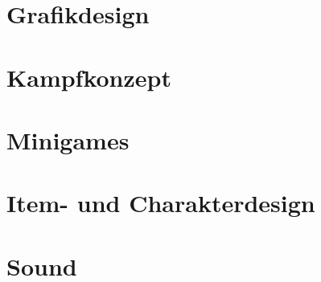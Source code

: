 \section{Grafikdesign}


\section{Kampfkonzept}


\section{Minigames}


\section{Item- und Charakterdesign}


\section{Sound}


